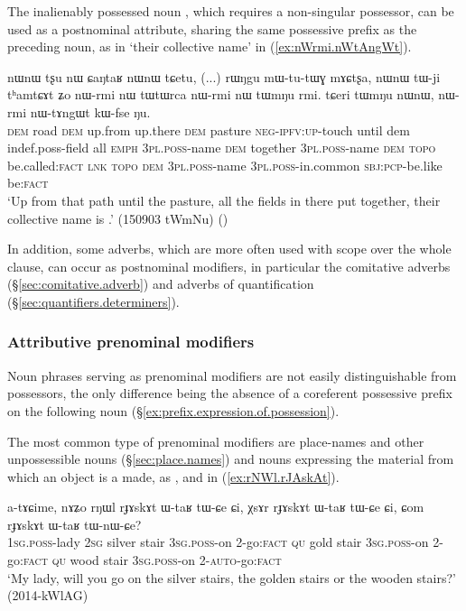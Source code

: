 The inalienably possessed noun , which requires a non-singular possessor, can be used as a postnominal attribute, sharing the same possessive prefix as the preceding noun, as in  `their collective name' in (\ref{ex:nWrmi.nWtAngWt}).

\begin{exe}
\ex \label{ex:nWrmi.nWtAngWt}
\gll nɯnɯ tʂu nɯ ɕaŋtaʁ nɯnɯ tɕetu, (...) rɯŋgu mɯ-tu-tɯɣ mɤɕtʂa, nɯnɯ tɯ-ji tʰamtɕɤt ʑo nɯ-rmi nɯ tɯtɯrca nɯ-rmi nɯ tɯmŋu rmi.  tɕeri tɯmŋu nɯnɯ, nɯ-rmi nɯ-tɤngɯt kɯ-fse ŋu. \\
\textsc{dem} road \textsc{dem} up.from up.there \textsc{dem} {  } pasture \textsc{neg}-\textsc{ipfv}:\textsc{up}-touch until dem indef.poss-field all \textsc{emph} \textsc{3pl}.\textsc{poss}-name \textsc{dem} together \textsc{3pl}.\textsc{poss}-name \textsc{dem}  \textsc{topo} be.called:\textsc{fact} \textsc{lnk}  \textsc{topo} \textsc{dem}  \textsc{3pl}.\textsc{poss}-name  \textsc{3pl}.\textsc{poss}-in.common \textsc{sbj}:\textsc{pcp}-be.like be:\textsc{fact} \\
\glt `Up from that path until the pasture, all the fields in there put together, their collective name is .' (150903 tWmNu)
()
\end{exe}

In addition, some adverbs, which are more often used with scope over the whole clause, can occur as postnominal modifiers, in particular the comitative adverbs (§\ref{sec:comitative.adverb}) and adverbs of quantification (§\ref{sec:quantifiers.determiners}).

 
\subsubsection{Attributive prenominal modifiers}   \label{ex:attributive.prenominal}
Noun phrases serving as prenominal modifiers are not easily distinguishable from possessors, the only difference being the absence of a coreferent possessive prefix on the following noun (§\ref{ex:prefix.expression.of.possession}). 

The most common type of prenominal modifiers are place-names and other unpossessible nouns (§\ref{sec:place.names}) and nouns expressing the material from which an object is a made, as ,  and  in (\ref{ex:rNWl.rJAskAt}).

\begin{exe}
\ex \label{ex:rNWl.rJAskAt}
\gll a-tɤɕime, nɤʑo rŋɯl rɟɤskɤt ɯ-taʁ tɯ-ɕe ɕi, χsɤr rɟɤskɤt ɯ-taʁ tɯ-ɕe ɕi, ɕom rɟɤskɤt ɯ-taʁ tɯ-nɯ-ɕe? \\
\textsc{1sg}.\textsc{poss}-lady \textsc{2sg} silver stair \textsc{3sg}.\textsc{poss}-on 2-go:\textsc{fact}  \textsc{qu} gold stair \textsc{3sg}.\textsc{poss}-on 2-go:\textsc{fact} \textsc{qu} wood stair \textsc{3sg}.\textsc{poss}-on 2-\textsc{auto}-go:\textsc{fact} \\
\glt `My lady, will you go on the silver stairs, the golden stairs or the wooden stairs?' (2014-kWlAG)
\end{exe}


